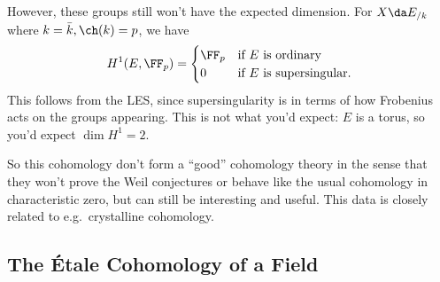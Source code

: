 \begin{example}[?]

However, these groups still won't have the expected dimension. For
\(X \da E_{/k}\) where \(k=\bar k, \ch(k) = p\), we have
\begin{align*}  
H^1(E, \FF_p) = 
\begin{cases}
\FF_p & \text{if $E$ is ordinary} \\
0 & \text{if $E$ is supersingular}.
\end{cases}
\end{align*} This follows from the LES, since supersingularity is in
terms of how Frobenius acts on the groups appearing. This is not what
you'd expect: \(E\) is a torus, so you'd expect \(\dim H^1 = 2\).

\end{example}

\begin{remark}

So this cohomology don't form a ``good'' cohomology theory in the sense
that they won't prove the Weil conjectures or behave like the usual
cohomology in characteristic zero, but can still be interesting and
useful. This data is closely related to e.g.~crystalline cohomology.

\end{remark}

\hypertarget{the-uxe9tale-cohomology-of-a-field}{%
\subsection{The Étale Cohomology of a
Field}\label{the-uxe9tale-cohomology-of-a-field}}


